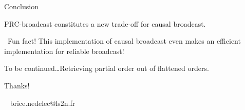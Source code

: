 \documentclass[10pt, xcolor={usenames, dvipsnames}]{beamer}
\begin{document}
\begin{frame}{Conclusion}
  
  PRC-broadcast constitutes a new trade-off for causal broadcast.

  \vspace{2em}

  \begin{table}
    \begin{center}
      
    \end{center}
  \end{table}

  \vspace{2em}

  \faLightbulbO~Fun fact! This implementation of causal broadcast even makes an
  efficient implementation for reliable broadcast!

\end{frame}


\begin{frame}[standout]

  To be continued\ldots Retrieving partial order out of flattened orders.
  
  \vspace{2em}
  
  \begin{center}
    
  \end{center}
  
\end{frame}


\begin{frame}[standout]

  \vspace{6em}
  
  Thanks!

  \vspace{5em}

  \small
  \faEnvelope ~ brice.nedelec@ls2n.fr

\end{frame}
\end{document}
